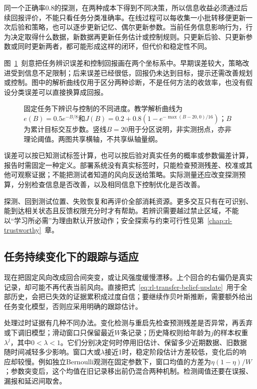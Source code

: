 同一个正确率$0.8$的探测，在两种成本下得到不同决策，所以信息收益必须通过后续回报评价，不能只看任务分类准确率。在线过程可以每收集一小批转移便更新一次后验和策略，也可以逐步更新记忆、偶尔更新参数。当前任务信息影响行为，行为决定取得什么数据，新数据再更新任务估计或控制规则。只更新后验、只更新参数或同时更新两者，都可能形成这样的闭环，但代价和稳定性不同。

图~\ref{fig:rl-transfer-identification-curves}~刻意把任务辨识误差和控制回报画在两个坐标系中。早期误差较大，策略改进受到信息不足限制；后来误差已经很低，回报仍未达到目标，提示还需改善规划或控制。图中的解析曲线仅用于区分两种诊断，不是任何方法的收敛率，也没有假设分类误差可以直接换算成回报。

\begin{figure}[htbp]
 \centering
 
 \caption{固定任务下辨识与控制的不同进度。教学解析曲线为$e(B)=0.5e^{-B/8}$和$J(B)=0.2+0.8(1-e^{-\max(B-20,0)/16})$；$B$为累计目标交互步数。竖线$B=20$用于分区说明，非实测拐点，亦非理论阈值。两图共享横轴，不共享纵轴量纲。}
 \label{fig:rl-transfer-identification-curves}
\end{figure}

误差可以按已知测试标签计算，也可以按后验对真实任务的概率或参数偏差计算，报告时需固定一种定义。部署系统没有真实标签时，只能检查预测残差、校准或其他可观察证据；不能把测试者知道的风向反送给策略。实际测量还应改变探测预算，分别检查信息是否改善，以及相同信息下控制优化是否改善。

探测、回到测试位置、失败恢复和再评价全部消耗资源。更多交互只有在可识别、能到达相关状态且反馈权限充分时才有帮助。若辨识需要越过禁止区域，不能以“学习所必需”为理由默认开放动作；安全探索与约束可行性见第~\ref{chap:rl-trustworthy}~章。

\subsection{任务持续变化下的跟踪与适应}
\label{sec:rl-transfer-tracking}

现在把固定风向改成回合间突变，或让风强度缓慢漂移。上个回合的右偏仍是真实记录，却可能不再代表当前风向。直接把式~\eqref{eq:rl-transfer-belief-update}~用于全部历史，会把已失效的证据累积成过度自信；要继续作贝叶斯推断，需要额外给出任务变化模型，否则应采用明确的跟踪估计。

处理过时证据有几种不同办法。变化检测与重启先检查预测残差是否异常，再丢弃或下调旧模型；滑动窗口只保留最近$W$条记录；历史降权则给年龄为$j$的样本权重$\lambda^j$，其中$0<\lambda<1$。它们分别决定何时停用旧估计、保留多少近期数据、旧数据随时间减轻多少影响。窗口大或$\lambda$接近1时，稳定阶段估计方差较低，变化后的响应却较慢。例如独立Bernoulli观测在固定参数下，窗口均值的方差为$\eta(1-\eta)/W$；参数突变后，这个均值在旧记录移出前仍混合两种机制。检测阈值还要在误报、漏报和延迟间取舍。


